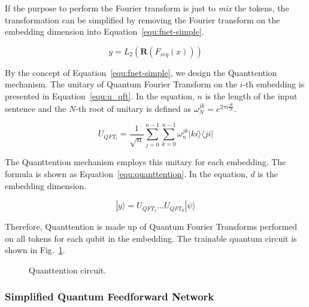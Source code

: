 If the purpose to perform the Fourier transform is just to \emph{mix} the tokens, the transformation can be simplified by removing the Fourier transform on the embedding dimension into Equation~\ref{equ:fnet-simple}.

\begin{equation} \label{equ:fnet-simple}
y = L_2(\mathbf{R}(F_{seq}(x)))
\end{equation}

By the concept of Equation~\ref{equ:fnet-simple}, we design the Quanttention mechanism. The unitary of Quantum Fourier Transform on the $i$-th embedding is presented in Equation~\ref{equ:u_qft}. In the equation, $n$ is the length of the input sentence and the $N$-th root of unitary is defined as $\omega^{jk}_N = e^{2\pi i \frac{jk}{N}}$.

\begin{equation} \label{equ:u_qft}
U_{QFT_i} = \frac{1}{\sqrt{n}} \sum_{j=0}^{n-1}  \sum_{k=0}^{n-1} \omega _{n}^{jk} |ki\rangle \langle ji|
\end{equation}

The Quanttention mechanism employs this unitary for each embedding. The formula is shown as Equation~\ref{equ:quanttention}. In the equation, $d$ is the embedding dimension.
 
\begin{equation} \label{equ:quanttention}
|y\rangle = U_{QFT_1}\ldots U_{QFT_d}|\psi\rangle
\end{equation}

Therefore, Quanttention is made up of Quantum Fourier Transforms performed on all tokens for each qubit in the embedding. The trainable quantum circuit is shown in Fig.~\ref{fig:quanttention}.

\begin{figure}[htp!]
  \centering
  \caption{Quanttention circuit.}
  \label{fig:quanttention}
\end{figure}


\subsubsection{Simplified Quantum Feedforward Network}


